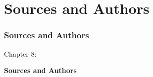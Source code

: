 %

\section{Sources and Authors}
\begin{frame}[fragile]
	\frametitle{Sources and Authors}

	\begin{center}\huge{Chapter 8:}\end{center}
	\begin{center}\huge{\color{typo3darkgrey}\textbf{Sources and Authors}}\end{center}

\end{frame}

